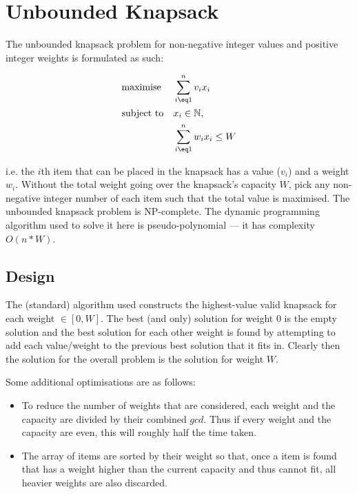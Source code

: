 \section{Unbounded Knapsack}
The unbounded knapsack problem for non-negative integer values and positive integer weights is formulated as such:

\begin{equation*}\begin{aligned}
&\text{maximise}   & & \sum_{i \eq 1}^{n} v_i x_i \\
&\text{subject to} & & x_i \in \mathbb{N}, \\
&                  & & \sum_{i \eq 1}^{n} w_i x_i \leq W
\end{aligned}\end{equation*}

i.e. the $i$th item that can be placed in the knapsack has a value ($v_i$) and a weight $w_i$. Without the total weight going over the knapsack's capacity $W$, pick any non-negative integer number of each item such that the total value is maximised. The unbounded knapsack problem is NP-complete\cite{np-complete}. The dynamic programming algorithm used to solve it here is pseudo-polynomial --- it has complexity $O(n*W)$.

\subsection{Design}
The (standard) algorithm used constructs the highest-value valid knapsack for each weight  $\in [0,W]$. The best (and only) solution for weight $0$ is the empty solution and the best solution for each other weight is found by attempting to add each value/weight to the previous best solution that it fits in. Clearly then the solution for the overall problem is the solution for weight $W$.

Some additional optimisations are as follows:
\begin{itemize}
\item To reduce the number of weights that are considered, each weight and the capacity are divided by their combined $gcd$. Thus if every weight and the capacity are even, this will roughly half the time taken.
\item The array of items are sorted by their weight so that, once a item is found that has a weight higher than the current capacity and thus cannot fit, all heavier weights are also discarded.
\end{itemize}

